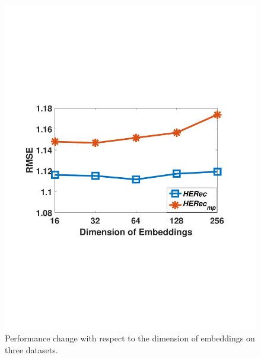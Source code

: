 \begin{figure}[t]
{\begin{minipage}[t]{0.3\textwidth}
\includegraphics[width=1\textwidth]{image/dim_yelp.pdf}
\end{minipage}
}
\caption{\label{fig_dim}Performance change with respect to the dimension of embeddings on three datasets.}
\end{figure}


